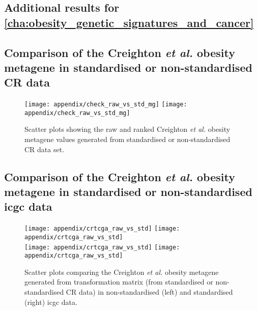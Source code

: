 \begin{appendices}
	\renewcommand{\thesection}{\Alph{chapter}\arabic{section}}

	\chapter{Additional results for \cref{cha:obesity_genetic_signatures_and_cancer}}
	\label{app:a}

	\section{Comparison of the Creighton \textit{et al.} obesity metagene in standardised or non-standardised CR data}
	\label{sec:metagenes_created_from_raw_data_vs_standardised_data}

	\begin{figure}[htpb]
		\centering
		\texttt{[image: appendix/check\_raw\_vs\_std\_mg]}
		\hfill
		\texttt{[image: appendix/check\_raw\_vs\_std\_mg]}
		\caption{Scatter plots showing the raw and ranked Creighton \textit{et al.} obesity metagene values generated from standardised or non-standardised CR data set. }
		\label{fig:appendix/check_raw_vs_std}
	\end{figure}

	\section{Comparison of the Creighton \textit{et al.} obesity metagene in standardised or non-standardised \gls{icgc} data}
	\label{sec:comp_cr_raw_std_icgc}

	\begin{figure}[h]
		\centering
		\texttt{[image: appendix/crtcga\_raw\_vs\_std]}
		\hfill
		\texttt{[image: appendix/crtcga\_raw\_vs\_std]}\\
		\texttt{[image: appendix/crtcga\_raw\_vs\_std]}
		\hfill
		\texttt{[image: appendix/crtcga\_raw\_vs\_std]}\\
		\caption{Scatter plots comparing the Creighton \textit{et al.} obesity metagene generated from transformation matrix (from standardised or non-standardised CR data) in non-standardised (left) and standardised (right) \gls{icgc} data.}
		\label{fig:appendix/check_raw_vs_std}
	\end{figure}


\end{appendices}
